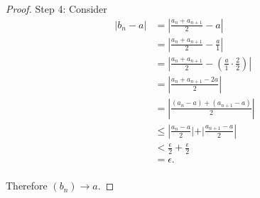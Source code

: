 \documentclass[10pt]{article}
\begin{document}
\begin{enumerate}
\begin{proof}
Step 4: Consider 
    \begin{align*}
    |b_n-a| &= |\frac{a_n + a_{n+1}}{2}-a|\\
    &=\left|\frac{a_n + a_{n+1}}{2}-\frac{a}{1}\right|\\
    &=\left|\frac{a_n + a_{n+1}}{2}-(\frac{a}{1}\cdot\frac{2}{2})\right|\\
    &=\left|\frac{a_n+a_{n+1}-2a}{2}\right|\\
    &=\left|\frac{(a_n-a)+(a_{n+1}-a)}{2}\right|\\
    &\leq \left|\frac{a_n-a}{2}|+|\frac{a_{n+1}-a}{2}\right|\\
    &< \frac{\epsilon}{2}+\frac{\epsilon}{2}\\
    &=\epsilon.\\
    \end{align*}

Therefore $(b_n) \rightarrow a$.
\end{proof}

\end{enumerate}
\end{document}
